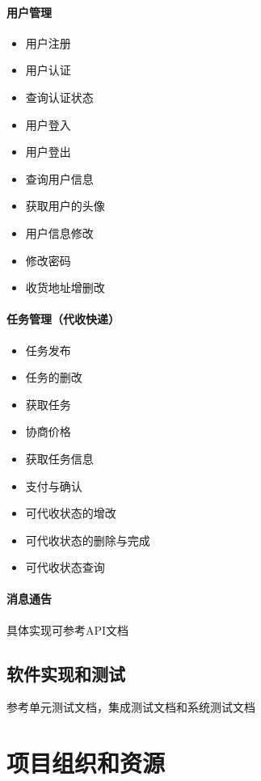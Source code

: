 \documentclass[UTF8]{dingo}
\begin{document}
        \paragraph{用户管理}
          \begin{itemize}
             \item 用户注册
             \item 用户认证
             \item 查询认证状态
             \item 用户登入
             \item 用户登出
             \item 查询用户信息
             \item 获取用户的头像
             \item 用户信息修改
             \item 修改密码
             \item 收货地址增删改
          \end{itemize}
        \paragraph{任务管理（代收快递）}
        \begin{itemize}
          \item 任务发布
          \item 任务的删改
          \item 获取任务
          \item 协商价格
          \item 获取任务信息
          \item 支付与确认
          \item 可代收状态的增改
          \item 可代收状态的删除与完成
          \item 可代收状态查询
        \end{itemize}
     \paragraph{消息通告}

     具体实现可参考API文档

   \subsection{软件实现和测试}
     参考单元测试文档，集成测试文档和系统测试文档

  \section{项目组织和资源}
\end{document}
